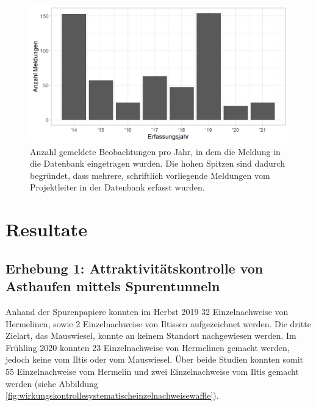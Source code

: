 \documentclass[
  oneside]{scrbook}
\begin{document}
\begin{figure}
\includegraphics[width=1\linewidth]{images/beobachtungsmeldungen_histogramm} \caption{Anzahl gemeldete Beobachtungen pro Jahr, in dem die Meldung in die Datenbank eingetragen wurden. Die hohen Spitzen sind dadurch begründet, dass mehrere, schriftlich vorliegende Meldungen vom Projektleiter in der Datenbank erfasst wurden.}\label{fig:beobachtungsmeldungenhistogramm}
\end{figure}

\hypertarget{resultate}{%
\chapter{Resultate}\label{resultate}}

\hypertarget{erhebung-1-attraktivituxe4tskontrolle-von-asthaufen-mittels-spurentunneln-1}{%
\section{Erhebung 1: Attraktivitätskontrolle von Asthaufen mittels Spurentunneln}\label{erhebung-1-attraktivituxe4tskontrolle-von-asthaufen-mittels-spurentunneln-1}}

Anhand der Spurenpapiere konnten im Herbst 2019 32 Einzelnachweise von Hermelinen, sowie 2 Einzelnachweise von Iltissen aufgezeichnet werden. Die dritte Zielart, das Mauswiesel, konnte an keinem Standort nachgewiesen werden. Im Frühling 2020 konnten 23 Einzelnachweise von Hermelinen gemacht werden, jedoch keine vom Iltis oder vom Mauswiesel. Über beide Studien konnten somit 55 Einzelnachweise vom Hermelin und zwei Einzelnachweise vom Iltis gemacht werden (siehe Abbildung \ref{fig:wirkungskontrollesystematischeinzelnachweisewaffle}).
\end{document}
